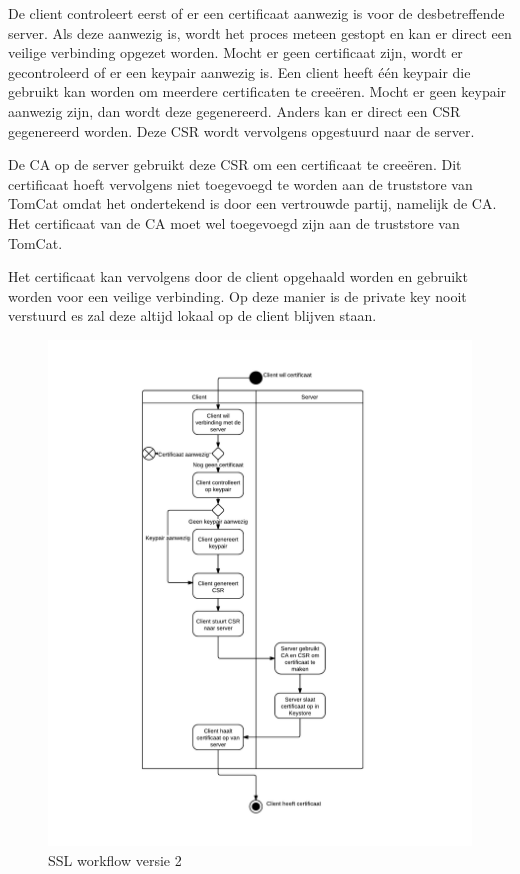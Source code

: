 \documentclass[]{article}
\begin{document}
De client controleert eerst of er een certificaat aanwezig is voor de
desbetreffende server. Als deze aanwezig is, wordt het proces meteen gestopt en
kan er direct een veilige verbinding opgezet worden. Mocht er geen certificaat
zijn, wordt er gecontroleerd of er een keypair aanwezig is. Een client heeft
\'e\'en keypair die gebruikt kan worden om meerdere certificaten te
cree\"eren. Mocht er geen keypair aanwezig zijn, dan wordt deze gegenereerd. Anders
kan er direct een CSR gegenereerd worden. Deze CSR wordt vervolgens opgestuurd
naar de server.

De CA op de server gebruikt deze CSR om een certificaat te cree\"eren. Dit
certificaat hoeft vervolgens niet toegevoegd te worden aan de truststore van
TomCat omdat het ondertekend is door een vertrouwde partij, namelijk de CA. Het
certificaat van de CA moet wel toegevoegd zijn aan de truststore van TomCat.

Het certificaat kan vervolgens door de client opgehaald worden en gebruikt
worden voor een veilige verbinding. Op deze manier is de private key nooit
verstuurd es zal deze altijd lokaal op de client blijven staan. 

\newpage

\begin{figure}[htpb]
   \begin{center}
     \includegraphics[height=0.86\textheight]{ssl_ad_2.pdf}
   \end{center}
   \caption{SSL workflow versie 2}
   \label{ssl_ad_2}
\end{figure}
\end{document}
